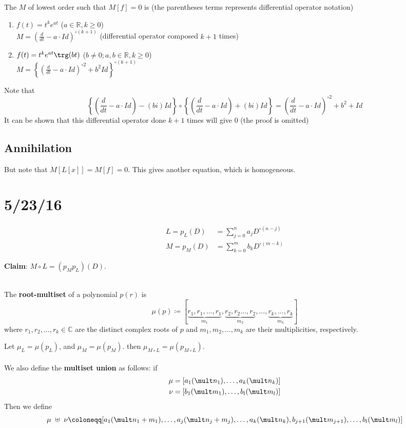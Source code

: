 \documentclass[12pt]{article}
\begin{document}
\begin{theorem}
The $M$ of lowest order such that $M[f] = 0$ is (the parentheses terms represents differential operator notation)
\begin{enumerate}
\item $f(t) = t^ke^{at}$ ($a \in \mathbb{R}, k \ge 0$) \\
  $M = \left(\frac{d}{dt} - a \cdot Id\right)^{\circ(k+1)}$ (differential operator composed $k+1$ times)
\item $f(t) = t^ke^{at}\trg(bt)$ ($b \neq 0; a,b \in \mathbb{R}, k \ge 0$) \\
  $M = \left\{\left(\frac{d}{dt} - a \cdot Id\right)^{\circ 2} + b^2Id\right\}^{\circ (k+1)}$
\end{enumerate}
\end{theorem}

Note that \[ \left\{\left(\frac{d}{dt} - a\cdot Id\right) - (bi)Id\right\} \circ \left\{\left(\frac{d}{dt} - a\cdot Id\right) + (bi)Id\right\} = \left(\frac{d}{dt} - a\cdot Id\right)^{\circ 2} + b^2 + Id \]
It can be shown that this differential operator done $k+1$ times will give $0$ (the proof is omitted) 
\subsection{Annihilation}
But note that $M[L[x]] = M[f] = 0$. This gives another equation, which is homogeneous.

\section{5/23/16}
\[
\begin{aligned}
  L = p_L(D) &= \sum_{j=0}^na_jD^{\circ (n-j)} \\
  M = p_M(D) &= \sum_{k=0}^mb_kD^{\circ (m-k)} 
\end{aligned}
\]

\textbf{Claim}: $M \circ L = (p_Mp_L)(D)$. \\ \\
\begin{definition}
The \textbf{root-multiset} of a polynomial $p(r)$ is \[ \mu(p) \coloneqq [\underbrace{r_1,r_1,\dots,r_1}_{m_1},\underbrace{r_2,r_2\dots,r_2}_{m_2}, \dots,\underbrace{r_k,\dots,r_k}_{m_k}] \]
where $r_1,r_2,\dots,r_k \in \mathbb{C}$ are the distinct complex roots of $p$ and $m_1,m_2,\dots,m_k$ are their multiplicities, respectively.
\end{definition}

Let $\mu_L = \mu(p_L)$, and $\mu_M = \mu(p_M)$. then $\mu_{M \circ L} = \mu(p_{M \circ L})$. \\ \\
We also define the \textbf{multiset union} as follows: if
\[
\begin{aligned}
  \mu &= [a_1(\mult n_1), \dots,a_k (\mult n_k)] \\
  \nu &= [b_1(\mult m_1), \dots,b_l (\mult m_l)]
\end{aligned}
\]
Then we define \[ \mu \ \uplus \ \nu \coloneqq [a_1 (\mult n_1 + m_1), \dots, a_j (\mult n_j + m_j), \dots, a_k (\mult n_k), b_{j+1} (\mult m_{j+1}), \dots, b_l(\mult m_l)] \]
\end{document}

